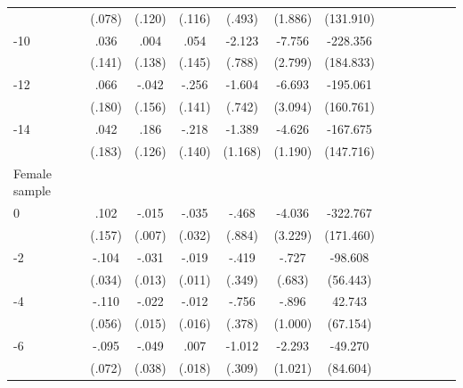 \begin{table}[p]
\begin{adjustbox}{max width=\linewidth}
\begin{threeparttable}
{\begin{tabular}{l*{6}{S S}}
                &   (.078)         &   (.120)         &   (.116)         &   (.493)         &  (1.886)         &(131.910)         \\
-10            &     .036         &     .004         &     .054         &   -2.123\sym{***}&   -7.756\sym{***}& -228.356         \\
                &   (.141)         &   (.138)         &   (.145)         &   (.788)         &  (2.799)         &(184.833)         \\
-12           &     .066         &    -.042         &    -.256\sym{*}  &   -1.604\sym{**} &   -6.693\sym{**} & -195.061         \\
                &   (.180)         &   (.156)         &   (.141)         &   (.742)         &  (3.094)         &(160.761)         \\
-14           &     .042         &     .186         &    -.218         &   -1.389         &   -4.626\sym{***}& -167.675         \\
                &   (.183)         &   (.126)         &   (.140)         &  (1.168)         &  (1.190)         &(147.716)         \\
\midrule
Female sample &&&&&&\\
0               &     .102         &    -.015\sym{**} &    -.035         &    -.468         &   -4.036         & -322.767\sym{*}  \\
                &   (.157)         &   (.007)         &   (.032)         &   (.884)         &  (3.229)         &(171.460)         \\
-2             &    -.104\sym{***}&    -.031\sym{**} &    -.019\sym{*}  &    -.419         &    -.727         &  -98.608\sym{*}  \\
                &   (.034)         &   (.013)         &   (.011)         &   (.349)         &   (.683)         & (56.443)         \\
-4             &    -.110\sym{**} &    -.022         &    -.012         &    -.756\sym{**} &    -.896         &   42.743         \\
                &   (.056)         &   (.015)         &   (.016)         &   (.378)         &  (1.000)         & (67.154)         \\
-6             &    -.095         &    -.049         &     .007         &   -1.012\sym{***}&   -2.293\sym{**} &  -49.270         \\
                &   (.072)         &   (.038)         &   (.018)         &   (.309)         &  (1.021)         & (84.604)         \\

\end{tabular}}
\end{threeparttable}
\end{adjustbox}
\end{table}
